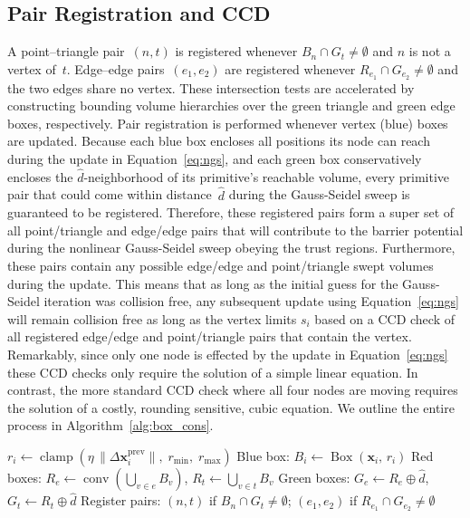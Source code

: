\documentclass[acmtog,anonymous,review]{acmart}
\DeclareMathOperator{\conv}{conv}
\begin{document}
\subsection{Pair Registration and CCD}
\label{sec:pair_registration}
A point--triangle pair~$(n,t)$ is registered whenever
$B_n \cap G_t \neq \emptyset$ and $n$ is not a vertex of~$t$. 
Edge--edge pairs~$(e_1,e_2)$ are registered whenever
$R_{e_1} \cap G_{e_2} \neq \emptyset$ and the two edges share no
vertex. 
These intersection tests are accelerated by constructing
bounding volume hierarchies over the green triangle and green edge
boxes, respectively.
Pair registration is performed whenever vertex (blue) boxes are updated. 
Because each blue box encloses all positions its node can reach during the update in Equation~\eqref{eq:ngs}, and each
green box conservatively encloses the $\hat{d}$-neighborhood of its
primitive's reachable volume, every primitive pair that could come
within distance~$\hat{d}$ during the Gauss-Seidel sweep is guaranteed to be
registered. 
Therefore, these registered pairs form a super set of all point/triangle and edge/edge pairs that will contribute to the barrier potential during the nonlinear Gauss-Seidel sweep obeying the trust regions.
Furthermore, these pairs contain any possible edge/edge and point/triangle swept volumes during the update.
This means that as long as the initial guess for the Gauss-Seidel iteration was collision free, any subsequent update using Equation~\eqref{eq:ngs} will remain collision free as long as the vertex limits $s_i$ based on a CCD check of all registered edge/edge and point/triangle pairs that contain the vertex.
Remarkably, since only one node is effected by the update in Equation~\eqref{eq:ngs} these CCD checks only require the solution of a simple linear equation.
In contrast, the more standard CCD check where all four nodes are moving requires the solution of a costly, rounding sensitive, cubic equation.
We outline the entire process in Algorithm~\ref{alg:box_cons}.

\begin{algorithm}[!ht]
\caption{Box construction}
\label{alg:box_cons}
\begin{algorithmic}[1]
  \STATE $r_i \leftarrow \operatorname{clamp}(
    \eta\,\|\Delta\mathbf{x}_i^{\mathrm{prev}}\|,\;
    r_{\min},\; r_{\max})$
  \STATE \textcolor{blue!70!black}{Blue box:}\;
    $B_i \leftarrow \operatorname{Box}(\mathbf{x}_i,\, r_i)$
\ENDFOR
\STATE \textcolor{red!70!black}{Red boxes:}\;
  $R_e \leftarrow \conv(\bigcup_{v \in e} B_v)$,\;
  $R_t \leftarrow \bigcup_{v \in t} B_v$
\STATE \textcolor{green!50!black}{Green boxes:}\;
  $G_e \leftarrow R_e \oplus \hat{d}$,\;
  $G_t \leftarrow R_t \oplus \hat{d}$
\STATE Register pairs:\;
  $(n,t)$ if $B_n \cap G_t \neq \emptyset$;\;
  $(e_1,e_2)$ if $R_{e_1} \cap G_{e_2} \neq \emptyset$
\end{algorithmic}
\end{algorithm}
\end{document}
